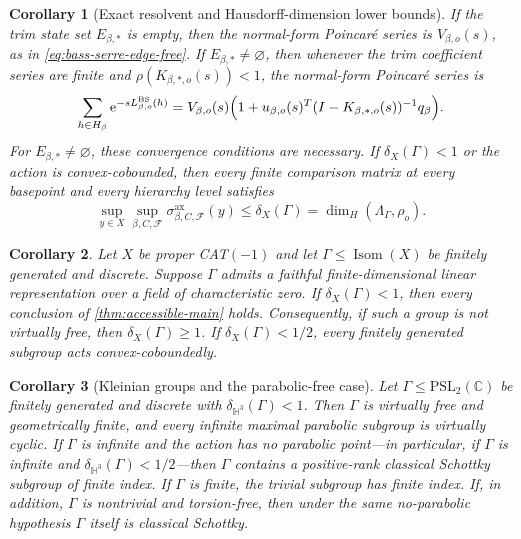 \documentclass[11pt]{article}
\newtheorem{corollary}[corollary]{Corollary}
\theoremstyle{definition}
\newcommand{\Isom}{\operatorname{Isom}}
\newcommand{\BS}{\mathrm{BS}}
\newcommand{\ax}{\mathrm{ax}}
\newcommand{\e}{\mathrm e}
\begin{document}
\begin{corollary}[Exact resolvent and Hausdorff-dimension lower bounds]
\label{cor:resolvent-dimension-bounds}
If the trim state set $E_{\beta,*}$ is empty, then the normal-form Poincar\'e series is
$V_{\beta,o}(s)$, as in \eqref{eq:bass-serre-edge-free}.  If
$E_{\beta,*}\ne\varnothing$, then whenever the trim coefficient series are finite and
$\rho(K_{\beta,*,o}(s))<1$, the normal-form Poincar\'e series is
\begin{equation}\label{eq:main-resolvent}
 \sum_{h\in H_\beta}\e^{-sL^{\BS}_{\beta,o}(h)}
 =V_{\beta,o}(s)
 \Bigl(1+u_{\beta,o}(s)^T(I-K_{\beta,*,o}(s))^{-1}q_\beta\Bigr).
\end{equation}
For $E_{\beta,*}\ne\varnothing$, these convergence conditions are necessary.  If $\delta_X(\Gamma)<1$ or the action is
convex-cobounded, then every finite comparison matrix at every basepoint and every hierarchy
level satisfies
\begin{equation}\label{eq:main-dimension-lower-bound}
 \sup_{y\in X}\sup_{\beta,C,\mathcal F}
 \sigma^{\ax}_{\beta,C,\mathcal F}(y)
 \le\delta_X(\Gamma)=\dim_H(\Lambda_\Gamma,\rho_o).
\end{equation}
\end{corollary}

\begin{corollary}
\label{cor:linear-groups}
Let $X$ be proper CAT$(-1)$ and let $\Gamma\le\Isom(X)$ be finitely generated and
discrete.  Suppose $\Gamma$ admits a faithful finite-dimensional linear representation over a
field of characteristic zero.  If $\delta_X(\Gamma)<1$, then every conclusion of
\cref{thm:accessible-main} holds.  Consequently, if such a group is not virtually
free, then $\delta_X(\Gamma)\ge1$. If $\delta_X(\Gamma)<1/2$, every finitely generated
subgroup acts convex-coboundedly.
\end{corollary}

\begin{corollary}[Kleinian groups and the parabolic-free case]
\label{cor:kleinian-classical}
Let $\Gamma\le\mathrm{PSL}_2(\mathbb C)$ be finitely generated and discrete with
$\delta_{\mathbb H^3}(\Gamma)<1$.  Then $\Gamma$ is virtually free and geometrically finite, and every
infinite maximal parabolic subgroup is virtually cyclic.  If $\Gamma$ is infinite and the action has
no parabolic point---in particular, if $\Gamma$ is infinite and
$\delta_{\mathbb H^3}(\Gamma)<1/2$---then $\Gamma$ contains a positive-rank classical Schottky subgroup
of finite index.  If $\Gamma$ is finite, the trivial subgroup has finite index.  If, in addition,
$\Gamma$ is nontrivial and torsion-free, then under the same no-parabolic hypothesis $\Gamma$ itself
is classical Schottky.
\end{corollary}
\end{document}
